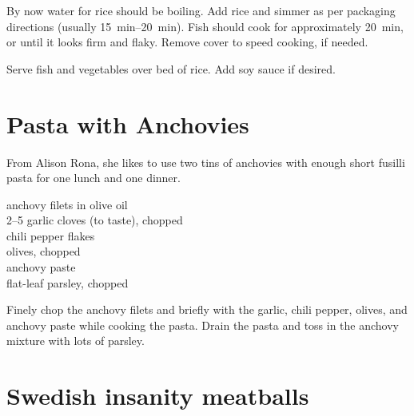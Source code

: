 By now water for rice should be boiling. Add rice and simmer as per packaging
directions (usually \SIrange{15}{20}{\minute}). Fish should cook for
approximately \SI{20}{\minute}, or until it looks firm and flaky. Remove cover
to speed cooking, if needed.

Serve fish and vegetables over bed of rice. Add soy sauce if desired.

\section{Pasta with Anchovies}

\begin{open}
    From Alison Rona, she likes to use two tins of anchovies with enough short fusilli pasta for one lunch and one dinner.
\end{open}
\begin{ingredients}
    anchovy filets in olive oil\\
    \numrange{2}{5} garlic cloves (to taste), chopped\\
    chili pepper flakes\\
    olives, chopped\\
    anchovy paste\\
    flat-leaf parsley, chopped
\end{ingredients}
Finely chop the anchovy filets and briefly \saute with the garlic, chili pepper, olives, and anchovy paste while cooking the pasta.  Drain the pasta and toss in the anchovy mixture with lots of parsley.

\section{Swedish insanity meatballs}

